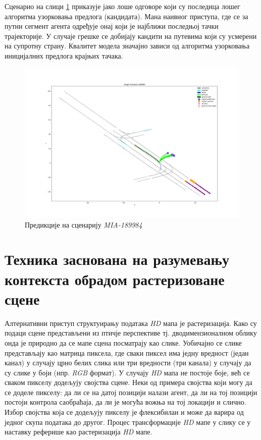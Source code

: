\documentclass[11pt,oneside]{memoir}
\begin{document}
Сценарио на слици \ref{tnt-MIA-189984} приказује јако лоше одговоре који су последица лошег алгоритма узорковања предлога (кандидата). Мана
наивног приступа, где се за путни сегмент агента одређује онај који је најближи последњој тачки трајекторије. У случаје грешке се добијају
кандити на путевима који су усмерени на супротну страну. Квалитет модела значајно зависи од алгоритма узорковања иницијалних предлога 
крајњих тачака.

\begin{figure}[H]
  \centering
  \includegraphics[width=1.0\textwidth]{images/MIA_189984.png}
  \caption{Предикције на сценарију \textit{MIA-189984} \label{tnt-MIA-189984}}
\end{figure}

\chapter{Техника заснована на разумевању контекста обрадом растеризоване сцене}
\label{chp:razrada}

Алтернативни приступ структуирању података \textit{HD} мапа је растеризација. Како су подаци
сцене представљени из птичје перспективе тј. дводимензионалном облику онда је природно да се мапе сцена посматрају као слике. 
Уобичајно се слике представљају као матрица пиксела, где сваки пиксел има једну вредност (један канал) у случају црно белих слика или 
три вредности (три канала) у случају да су слике у боји (нпр. \textit{RGB} формат). У случају \textit{HD}
мапа не постоје боје, већ се сваком пикселу додељују својства сцене. Неки од примера својства који могу 
да се доделе пикселу: да ли се на датој позицији налази агент,
да ли на тој позицији постоји контрола саобраћаја, да ли је могућа вожња на тој локацији и слично. Избор својства која се додељују
пикселу је флексибилан и може да варира од једног скупа података до другог.
Процес трансформације \textit{HD} мапе у слику се у наставку реферише као растеризација \textit{HD} мапе. 
\end{document}
